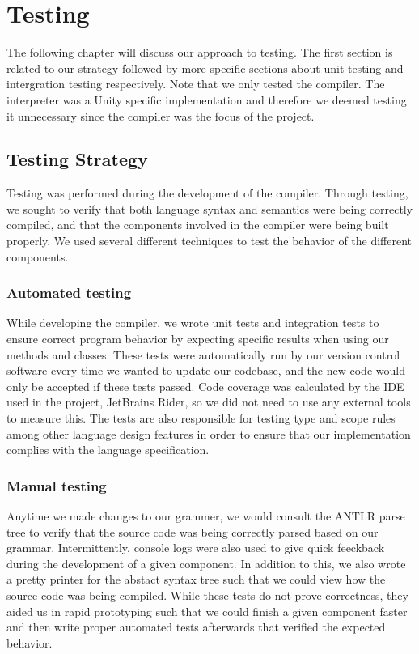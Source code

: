 \chapter{Testing}

The following chapter will discuss our approach to testing.
The first section is related to our strategy followed by more specific sections about unit testing and intergration testing respectively.
Note that we only tested the \dazel{} compiler. 
The interpreter was a Unity specific implementation and therefore we deemed testing it unnecessary since the compiler was the focus of the project.

\section{Testing Strategy}
Testing was performed during the development of the \dazel{} compiler. 
Through testing, we sought to verify that both language syntax and semantics were being correctly compiled, and that the components involved in the compiler were being built properly.
We used several different techniques to test the behavior of the different components. 

\subsection*{Automated testing}
While developing the compiler, we wrote unit tests and integration tests to ensure correct program behavior by expecting specific results when using our methods and classes. 
These tests were automatically run by our version control software every time we wanted to update our codebase, and the new code would only be accepted if these tests passed.
Code coverage was calculated by the IDE used in the project, JetBrains Rider, so we did not need to use any external tools to measure this\cite{rider_test_coverage}.
The tests are also responsible for testing type and scope rules among other language design features in order to ensure that our implementation complies with the language specification.

\subsection*{Manual testing}
Anytime we made changes to our grammer, we would consult the ANTLR parse tree to verify that the source code was being correctly parsed based on our grammar. 
Intermittently, console logs were also used to give quick feeckback during the development of a given component.
In addition to this, we also wrote a pretty printer for the abstact syntax tree such that we could view how the source code was being compiled.
While these tests do not prove correctness, they aided us in rapid prototyping such that we could finish a given component faster and then write proper automated tests afterwards that verified the expected behavior.  

